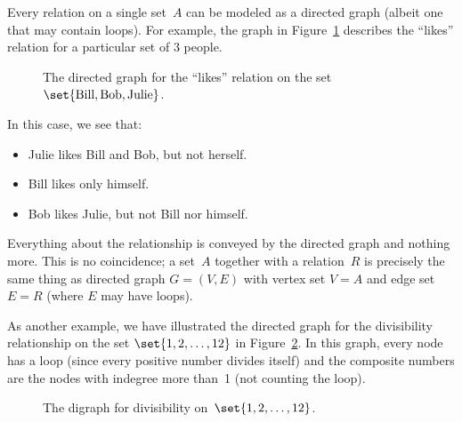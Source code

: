 Every relation on a single set~$A$ can be modeled as a directed graph
(albeit one that may contain loops).  For example, the graph in
Figure~\ref{fig:7FE} describes the ``likes'' relation for a particular
set of 3 people.

\begin{figure}



\caption{The directed graph for the ``likes'' relation on the set
  $\set{ \text{Bill}, \text{Bob}, \text{Julie} }$.}

\label{fig:7FE}

\end{figure}

In this case, we see that:
\begin{itemize}

\item
Julie likes Bill and Bob, but not herself.

\item
Bill likes only himself.

\item
Bob likes Julie, but not Bill nor himself.

\end{itemize}
Everything about the relationship is conveyed by the directed graph
and nothing more.  This is no coincidence; a set~$A$ together with a
relation~$R$ is precisely the same thing as directed graph $G = (V,
E)$ with vertex set $V = A$ and edge set $E = R$ (where $E$ may have
loops).

As another example, we have illustrated the directed graph for the
divisibility relationship on the set $\set{1, 2, \dots, 12}$ in
Figure~\ref{fig:7FF}.  In this graph, every node has a loop (since
every positive number divides itself) and the composite numbers are
the nodes with indegree more than~1 (not counting the
loop).

\begin{figure}



\caption{The digraph for divisibility on~$\set{1, 2, \dots, 12}$.}

\label{fig:7FF}

\end{figure}

